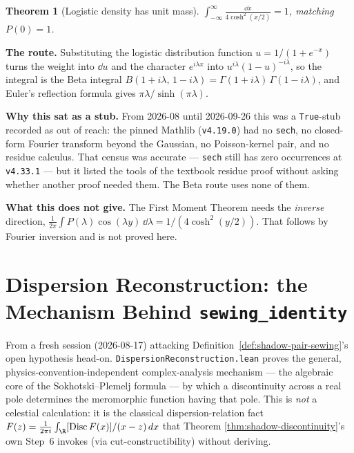 \documentclass{report}
\newtheorem{theorem}{Theorem}[chapter]
\theoremstyle{definition}
\begin{document}
\begin{theorem}[Logistic density has unit mass]
  \label{thm:logistic-density}
  \leanok
  $\int_{-\infty}^{\infty} \frac{\dd x}{4\cosh^2(x/2)} = 1$, matching $P(0)=1$.
\end{theorem}

\textbf{The route.} Substituting the logistic distribution function $u = 1/(1+e^{-x})$ turns
the weight into $\dd u$ and the character $e^{i\lambda x}$ into $u^{i\lambda}(1-u)^{-i\lambda}$,
so the integral is the Beta integral $B(1+i\lambda,\,1-i\lambda) = \Gamma(1+i\lambda)\,
\Gamma(1-i\lambda)$, and Euler's reflection formula gives $\pi\lambda/\sinh(\pi\lambda)$.

\textbf{Why this sat as a stub.} From 2026-08 until 2026-09-26 this was a \texttt{True}-stub
recorded as out of reach: the pinned Mathlib (\texttt{v4.19.0}) had no \texttt{sech}, no
closed-form Fourier transform beyond the Gaussian, no Poisson-kernel pair, and no residue
calculus. That census was accurate --- \texttt{sech} still has zero occurrences at
\texttt{v4.33.1} --- but it listed the tools of the textbook residue proof without asking
whether another proof needed them. The Beta route uses none of them.

\textbf{What this does not give.} The First Moment Theorem needs the \emph{inverse} direction,
$\frac{1}{2\pi}\int P(\lambda)\cos(\lambda y)\,\dd\lambda = 1/(4\cosh^2(y/2))$. That follows by
Fourier inversion and is not proved here.

\section{Dispersion Reconstruction: the Mechanism Behind \texorpdfstring{\texttt{sewing\_identity}}{sewing\_identity}}
\label{sec:dispersion-reconstruction}

From a fresh session (2026-08-17) attacking Definition~\ref{def:shadow-pair-sewing}'s
open hypothesis head-on. \texttt{DispersionReconstruction.lean} proves the general,
physics-convention-independent complex-analysis mechanism --- the algebraic core of the
Sokhotski--Plemelj formula --- by which a discontinuity across a real pole determines the
meromorphic function having that pole. This is \emph{not} a celestial calculation: it is
the classical dispersion-relation fact
$F(z) = \tfrac{1}{2\pi i}\int_\R [\mathrm{Disc}\,F(x)]/(x-z)\,dx$ that Theorem
\ref{thm:shadow-discontinuity}'s own Step~6 invokes (via cut-constructibility) without
deriving.
\end{document}
